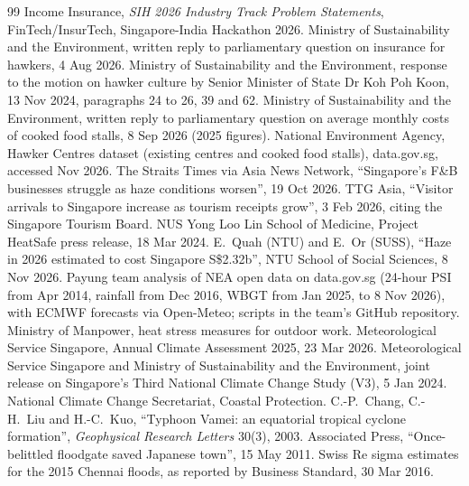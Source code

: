 \documentclass[11pt,a4paper]{article}
\newcommand{\sgd}{\textup{S\$}}
\begin{document}
\renewcommand{\refname}{\large References}
{\footnotesize\raggedright
\setlength{\bibsep}{1pt}
\begin{thebibliography}{99}
 Income Insurance, \emph{SIH 2026 Industry Track Problem Statements}, FinTech/InsurTech, Singapore-India Hackathon 2026.
 Ministry of Sustainability and the Environment, written reply to parliamentary question on insurance for hawkers, 4 Aug 2026.
 Ministry of Sustainability and the Environment, response to the motion on hawker culture by Senior Minister of State Dr Koh Poh Koon, 13 Nov 2024, paragraphs 24 to 26, 39 and 62.
 Ministry of Sustainability and the Environment, written reply to parliamentary question on average monthly costs of cooked food stalls, 8 Sep 2026 (2025 figures).
 National Environment Agency, Hawker Centres dataset (existing centres and cooked food stalls), data.gov.sg, accessed Nov 2026.
 The Straits Times via Asia News Network, ``Singapore's F\&B businesses struggle as haze conditions worsen'', 19 Oct 2026.
 TTG Asia, ``Visitor arrivals to Singapore increase as tourism receipts grow'', 3 Feb 2026, citing the Singapore Tourism Board.
 NUS Yong Loo Lin School of Medicine, Project HeatSafe press release, 18 Mar 2024.
 E.~Quah (NTU) and E.~Or (SUSS), ``Haze in 2026 estimated to cost Singapore \sgd 2.32b'', NTU School of Social Sciences, 8 Nov 2026.
 Payung team analysis of NEA open data on data.gov.sg (24-hour PSI from Apr 2014, rainfall from Dec 2016, WBGT from Jan 2025, to 8 Nov 2026), with ECMWF forecasts via Open-Meteo; scripts in the team's GitHub repository.
 Ministry of Manpower, heat stress measures for outdoor work.
 Meteorological Service Singapore, Annual Climate Assessment 2025, 23 Mar 2026.
 Meteorological Service Singapore and Ministry of Sustainability and the Environment, joint release on Singapore's Third National Climate Change Study (V3), 5 Jan 2024.
 National Climate Change Secretariat, Coastal Protection.
 C.-P.~Chang, C.-H.~Liu and H.-C.~Kuo, ``Typhoon Vamei: an equatorial tropical cyclone formation'', \emph{Geophysical Research Letters} 30(3), 2003.
 Associated Press, ``Once-belittled floodgate saved Japanese town'', 15 May 2011.
 Swiss Re sigma estimates for the 2015 Chennai floods, as reported by Business Standard, 30 Mar 2016.

\end{thebibliography}}
\end{document}
